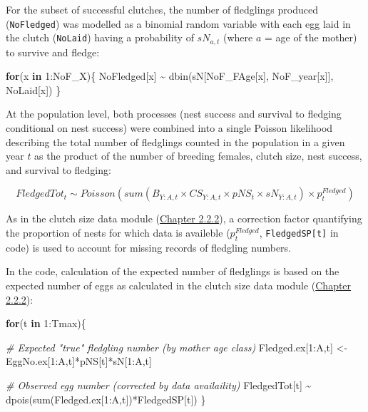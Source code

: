 \documentclass[
]{book}
\newenvironment{Shaded}{\begin{snugshade}}{\end{snugshade}}
\newcommand{\CommentTok}[1]{\textcolor[rgb]{0.56,0.35,0.01}{\textit{#1}}}
\newcommand{\ControlFlowTok}[1]{\textcolor[rgb]{0.13,0.29,0.53}{\textbf{#1}}}
\newcommand{\DecValTok}[1]{\textcolor[rgb]{0.00,0.00,0.81}{#1}}
\newcommand{\FunctionTok}[1]{\textcolor[rgb]{0.00,0.00,0.00}{#1}}
\newcommand{\NormalTok}[1]{#1}
\newcommand{\OtherTok}[1]{\textcolor[rgb]{0.56,0.35,0.01}{#1}}
\newcommand{\SpecialCharTok}[1]{\textcolor[rgb]{0.00,0.00,0.00}{#1}}
\begin{document}
For the subset of successful clutches, the number of fledglings produced
(\texttt{NoFledged}) was modelled as a binomial random variable with each egg laid in
the clutch (\texttt{NoLaid}) having a probability of \(sN_{a,t}\) (where \(a\) = age of the
mother) to survive and fledge:

\begin{Shaded}
\begin{Highlighting}[]
\ControlFlowTok{for}\NormalTok{(x }\ControlFlowTok{in} \DecValTok{1}\SpecialCharTok{:}\NormalTok{NoF\_X)\{}
\NormalTok{    NoFledged[x] }\SpecialCharTok{\textasciitilde{}} \FunctionTok{dbin}\NormalTok{(sN[NoF\_FAge[x], NoF\_year[x]], NoLaid[x])}
\NormalTok{\}}
\end{Highlighting}
\end{Shaded}

At the population level, both processes (nest success and survival to fledging
conditional on nest success) were combined into a single Poisson
likelihood describing the total number of fledglings counted in the population
in a given year \(t\) as the product of the number of breeding females, clutch
size, nest success, and survival to fledging:

\begin{equation}
FledgedTot_t  \sim Poisson(sum(B_{Y:A,t}\times CS_{Y:A,t}\times pNS_t\times sN_{Y:A,t}) \times p_t^{Fledged})
\end{equation}

As in the clutch size data module (\protect\hyperlink{ux5cux23ux5cux23ux5cux2520Clutchux5cux2520sizeux5cux2520dataux5cux2520likelihoods}{Chapter 2.2.2}),
a correction factor quantifying the proportion of nests for which data is
availeble (\(p_t^{Fledged}\), \texttt{FledgedSP{[}t{]}} in code) is used to account for
missing records of fledgling numbers.

In the code, calculation of the expected number of fledglings is based on the expected number of eggs as calculated in the clutch size data module
(\protect\hyperlink{ux5cux23ux5cux23ux5cux2520Clutchux5cux2520sizeux5cux2520dataux5cux2520likelihoods}{Chapter 2.2.2}):

\begin{Shaded}
\begin{Highlighting}[]
\ControlFlowTok{for}\NormalTok{(t }\ControlFlowTok{in} \DecValTok{1}\SpecialCharTok{:}\NormalTok{Tmax)\{}

    \CommentTok{\# Expected "true" fledgling number (by mother age class)}
\NormalTok{    Fledged.ex[}\DecValTok{1}\SpecialCharTok{:}\NormalTok{A,t] }\OtherTok{\textless{}{-}}\NormalTok{ EggNo.ex[}\DecValTok{1}\SpecialCharTok{:}\NormalTok{A,t]}\SpecialCharTok{*}\NormalTok{pNS[t]}\SpecialCharTok{*}\NormalTok{sN[}\DecValTok{1}\SpecialCharTok{:}\NormalTok{A,t]}

    \CommentTok{\# Observed egg number (corrected by data availaility)}
\NormalTok{    FledgedTot[t] }\SpecialCharTok{\textasciitilde{}} \FunctionTok{dpois}\NormalTok{(}\FunctionTok{sum}\NormalTok{(Fledged.ex[}\DecValTok{1}\SpecialCharTok{:}\NormalTok{A,t])}\SpecialCharTok{*}\NormalTok{FledgedSP[t])}
\NormalTok{\}}
\end{Highlighting}
\end{Shaded}
\end{document}
